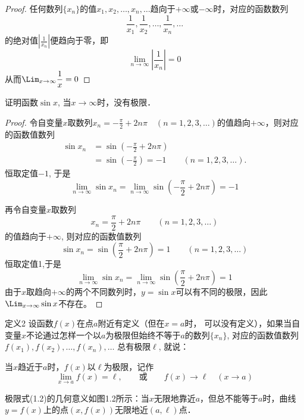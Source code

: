 \begin{proof}
任何数列$\{x_n\}$的值$x_1,x_2,\ldots,x_n,\ldots$趋向于$+\infty$或$-\infty$时，对应的函数数列
\[\frac{1}{x_1},\frac{1}{x_2},\ldots, \frac{1}{x_n},\ldots\]
的绝对值$\left|\frac{1}{x_n}\right|$便趋向于零，即
    \[\lim_{n\to\infty}\left|\frac{1}{x_n}\right|=0\]
    从而$\Lim_{x\to\infty}\frac{1}{x}=0$
\end{proof}

\begin{example}
证明函数$\sin x$, 当$x\to\infty$时，没有极限．
\end{example}

\begin{proof}
令自变量$x$取数列$x_n=-\frac{\pi}{2}+2n\pi\quad (n=1,2,3,\ldots)$的值趋向$+\infty$，则对应的函数值数列
\[\begin{split}
    \sin x_n&=\sin\left(-\frac{\pi}{2}+2n\pi\right)\\
&=\sin\left(-\frac{\pi}{2}\right) =-1 \qquad (n=1, 2, 3, \ldots) .
\end{split}\]
恒取定值$-1$, 于是
\[\lim_{n\to\infty} \sin x_n=\lim_{n\to\infty} \sin \left(-\frac{\pi}{2}+2n\pi\right)=-1\]

再令自变量$x$取数列
\[x_n=\frac{\pi}{2}+2n\pi\qquad  (n=1, 2, 3, \ldots )\]
的值趋向于$+\infty$, 则对应的函数值数列
\[\sin x_n =\sin\left(\frac{\pi}{2}+2n\pi\right) =1\qquad  (n=1, 2, 3, \ldots)\]
恒取定值1,于是
\[\lim_{n\to\infty} \sin x_n=\lim_{n\to\infty} \sin\left(\frac{\pi}{2}+2n\pi\right) =1\]
由于$x$取趋向$+\infty$的两个不同数列时，$y=\sin x$可以有不同的极限，因此
$\Lim_{x\to\infty} \sin x$不存在。
\end{proof}

\begin{blk}{定义2}
 设函数$f(x)$在点$a$附近有定义（但在$x=a$时，
可以没有定义），如果当自变量$x$不论通过怎样一个以$a$为极限但始终不等于$a$的数列$\{x_n\}$, 对应的函数值数列$f (x_1) ,f (x_2) , \ldots,f(x_n ) ,\ldots$
总有极限$\ell$, 就说：

当$x$趋近于$a$时，$f(x)$以$\ell$为极限，记作
\begin{equation}
   \lim_{x\to a}f(x)=\ell,\qquad \text{或}\qquad f(x)\to \ell\quad (x\to a) 
\end{equation}
\end{blk}

极限式(1.2)的几何意义如图1.2所示：当$x$无限地靠近$a$，但总不能等于$a$时，曲线$y=f(x)$上的点$(x,f(x))$无限地近$(a,\ell)$点．

\begin{figure}[htp]
    \centering
{}
    \caption{}
\end{figure}

